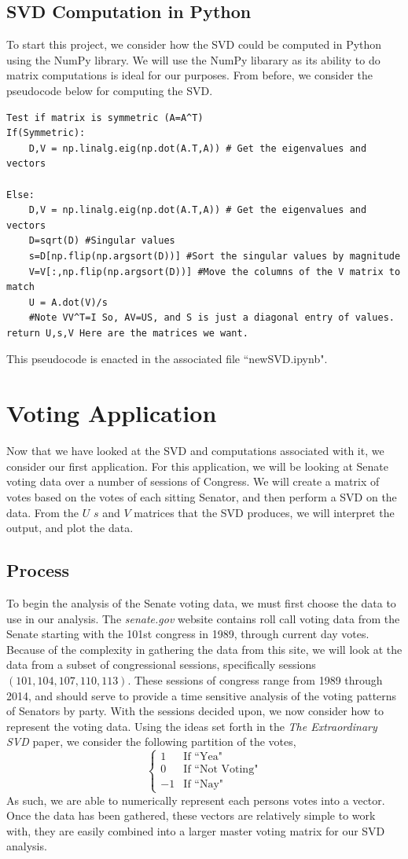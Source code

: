 \documentclass[letterpaper,12pt]{article}
\begin{document}
\subsection{SVD Computation in Python}
To start this project, we consider how the SVD could be computed in Python using the NumPy library. We will use the NumPy libarary as its ability to do matrix computations is ideal for our purposes. From before, we consider the pseudocode below for computing the SVD.
\begin{verbatim}
Test if matrix is symmetric (A=A^T)
If(Symmetric):
    D,V = np.linalg.eig(np.dot(A.T,A)) # Get the eigenvalues and vectors
	
Else:
    D,V = np.linalg.eig(np.dot(A.T,A)) # Get the eigenvalues and vectors
    D=sqrt(D) #Singular values
    s=D[np.flip(np.argsort(D))] #Sort the singular values by magnitude
    V=V[:,np.flip(np.argsort(D))] #Move the columns of the V matrix to match
    U = A.dot(V)/s 
    #Note VV^T=I So, AV=US, and S is just a diagonal entry of values.
return U,s,V Here are the matrices we want.
\end{verbatim}
This pseudocode is enacted in the associated file ``newSVD.ipynb".
\section{Voting Application}
Now that we have looked at the SVD and computations associated with it, we consider our first application. For this application, we will be looking at Senate voting data over a number of sessions of Congress. We will create a matrix of votes based on the votes of each sitting Senator, and then perform a SVD on the data. From the $U$ $s$ and $V$ matrices that the SVD produces, we will interpret the output, and plot the data.
\subsection{Process}
To begin the analysis of the Senate voting data, we must first choose the data to use in our analysis. The \textit{senate.gov} website contains roll call voting data from the Senate starting with the 101st congress in 1989, through current day votes. Because of the complexity in gathering the data from this site, we will look at the data from a subset of congressional sessions, specifically sessions $(101,104,107,110,113)$. These sessions of congress range from 1989 through 2014, and should serve to provide a time sensitive analysis of the voting patterns of Senators by party.  With the sessions decided upon, we now consider how to represent the voting data. Using the ideas set forth in the \textit{The Extraordinary SVD} paper, we consider the following partition of the votes,
\[\begin{cases}
1 & \text{If ``Yea"}\\
0 & \text{If ``Not Voting"}\\
-1 & \text{If ``Nay"}
\end{cases}\]
As such, we are able to numerically represent each persons votes into a vector. Once the data has been gathered, these vectors are relatively simple to work with, they are easily combined into a larger master voting matrix for our SVD analysis.
\end{document}
